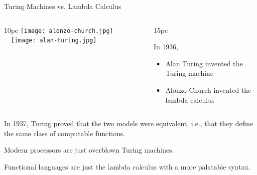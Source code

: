 \documentclass[handout]{plt}
\begin{document}
\begin{frame}[t]{Turing Machines vs. Lambda Calculus}

\vskip 1pc

  \begin{columns}
    \begin{column}{10pc}
      \texttt{[image: alonzo-church.jpg]} \ \ 
      \texttt{[image: alan-turing.jpg]}
    \end{column}
    \begin{column}{15pc}

In 1936,

\begin{itemize}
\item Alan Turing invented the Turing machine

\item Alonzo Church invented the lambda calculus
\end{itemize}

    \end{column}
  \end{columns}

In 1937, Turing proved that the two models were equivalent, i.e., that
they define the same class of computable functions.

Modern processors are just overblown Turing machines.

Functional languages are just the lambda calculus with a more
palatable syntax.


\end{frame}
\end{document}
